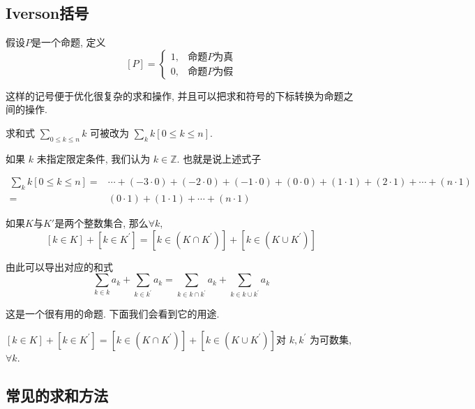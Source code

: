\documentclass{ctexart}
\begin{document}
\subsection{Iverson括号}

\begin{definition}[Iverson 括号]
	假设$P$是一个命题, 定义
	$$
		[P]=\left\{\begin{array}{lr}
			1, & \text{命题}P\text{为真} \\
			0, & \text{命题}P\text{为假}
		\end{array}\right.
	$$
\end{definition}

这样的记号便于优化很复杂的求和操作, 并且可以把求和符号的下标转换为命题之间的操作.

\begin{example}
	求和式 $\sum_{0 \leq k \leq n} k$ 可被改为 $\sum_k k[0 \leq k \leq n]$.

	如果 $k$ 未指定限定条件, 我们认为 $k \in \mathbb{Z}$. 也就是说上述式子

	$$
		\begin{aligned}
			\sum_k k[0 \leq k \leq n]= & \cdots+(-3 \cdot 0)+(-2 \cdot 0)+(-1 \cdot 0)+(0 \cdot 0)+(1 \cdot 1)+(2 \cdot 1)+\cdots  +(n \cdot 1) \\
			=                          & (0 \cdot 1)+(1 \cdot 1)+\cdots+(n \cdot 1)
		\end{aligned}
	$$

\end{example}

\begin{example}
	如果$K$与$K'$是两个整数集合, 那么$\forall k$,
	$$
		[k \in K]+\left[k \in K^{\prime}\right]=\left[k \in\left(K \cap K^{\prime}\right)\right]+\left[k \in\left(K \cup K^{\prime}\right)\right]
	$$

	由此可以导出对应的和式
	$$
		\sum_{k \in k} a_k+\sum_{k \in k^{\prime}} a_k=\sum_{k \in k \cap k^{\prime}} a_k+\sum_{k \in k \cup k^{\prime}} a_k
	$$
\end{example}

这是一个很有用的命题. 下面我们会看到它的用途.

\begin{proposition}
	$[k \in K]+\left[k \in K^{\prime}\right]=\left[k \in\left(K \cap K^{\prime}\right)\right]+\left[k \in\left(K \cup K^{\prime}\right)\right]$对 $k , k^{\prime}$ 为可数集, $\forall k$.
\end{proposition}

\subsection{常见的求和方法}
\end{document}
